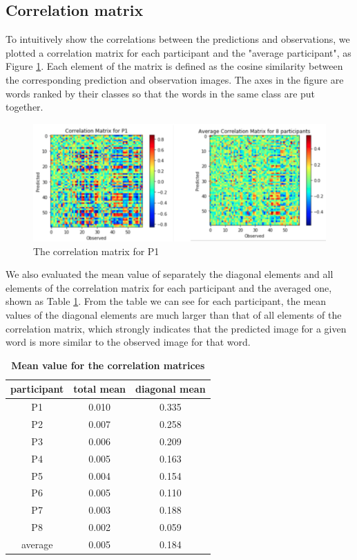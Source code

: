 \documentclass{article}
\begin{document}
\subsection{Correlation matrix}

To intuitively show the correlations between the predictions and observations, we plotted a correlation matrix for each participant and the "average participant", as Figure \ref{corr_mat}. Each element of the matrix is defined as the cosine similarity between the corresponding prediction and observation images. The axes in the figure are words ranked by their classes so that the words in the same class are put together.

\begin{figure}
\centering
\includegraphics[scale=0.2]{corrmat.png}
\caption{The correlation matrix for P1}
\label{corr_mat}
\end{figure}

We also evaluated the mean value of separately the diagonal elements and all elements of the correlation matrix for each participant and the averaged one, shown as Table \ref{table1}. From the table we can see for each participant, the mean values of the diagonal elements are much larger than that of all elements of the correlation matrix, which strongly indicates that the predicted image for a given word is more similar to the observed image for that word. 

\begin{table} 
    \centering
    \caption{{\bf Mean value for the correlation matrices}}\label{table1}
    \begin{tabular}{ccc}
    \hline
    participant & total mean & diagonal mean\\
    \hline
    P1 & 0.010 & 0.335   \\
    P2 & 0.007 & 0.258   \\
    P3 & 0.006 & 0.209   \\
    P4 & 0.005 & 0.163   \\
    P5 & 0.004 & 0.154   \\
    P6 & 0.005 & 0.110   \\
    P7 & 0.003 & 0.188   \\
    P8 & 0.002 & 0.059   \\
    average & 0.005 & 0.184   \\
    \hline
    \end{tabular}
\end{table}
\end{document}
